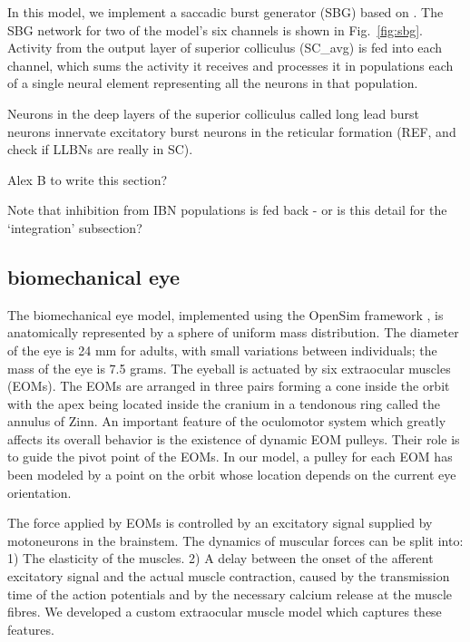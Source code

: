 \documentclass{frontiersSCNS}
\begin{document}
In this model, we implement a saccadic burst generator (SBG) based
on \cite{gancarz_neural_1998}. The SBG network for two of the model's
six channels is shown in Fig.~\ref{fig:sbg}. Activity from the output
layer of superior colliculus (SC\_avg) is fed into each channel, which
sums the activity it receives and processes it in populations each of
a single neural element representing all the neurons in that
population.

Neurons in the deep
layers of the superior colliculus called long lead burst neurons
innervate excitatory burst neurons in the reticular formation (REF,
and check if LLBNs are really in SC).

Alex B to write this section?

Note that inhibition from IBN populations is fed back - or is this
detail for the `integration' subsection?

\subsection{biomechanical eye}



The biomechanical eye model, implemented using the OpenSim framework
\cite{seth_opensim:_2011}, is anatomically represented by a sphere of
uniform mass distribution. The diameter of the eye is 24 mm for adults,
with small variations between individuals; the mass of the eye is 7.5 grams.
The eyeball is actuated by six extraocular muscles
(EOMs). The EOMs are arranged in three pairs forming a cone inside the
orbit with the apex being located inside the cranium in a tendonous
ring called the annulus of Zinn. An important feature of the
oculomotor system which greatly affects its overall behavior is the
existence of dynamic EOM pulleys. Their role is to guide the pivot
point of the EOMs. In our model, a pulley for each EOM has been
modeled by a point on the orbit whose location depends on the current
eye orientation.

The force applied by EOMs is controlled by an excitatory signal
supplied by motoneurons in the brainstem. The dynamics of muscular
forces can be split into: 1) The elasticity of the muscles. 2) A delay
between the onset of the afferent excitatory signal and the actual
muscle contraction, caused by the transmission time of the action
potentials and by the necessary calcium release at the muscle
fibres. We developed a custom extraocular muscle model which captures
these features.
\end{document}
